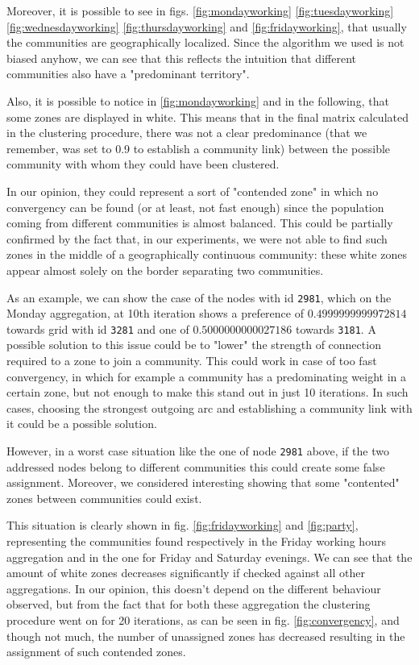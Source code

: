 \documentclass[12pt,a4paper]{article}
\begin{document}
Moreover, it is possible to see in figs. \ref{fig:mondayworking} \ref{fig:tuesdayworking} \ref{fig:wednesdayworking} \ref{fig:thursdayworking} and \ref{fig:fridayworking}, that usually the communities are geographically localized. Since the algorithm we used is not biased anyhow, we can see
that this reflects the intuition that different communities also have a "predominant territory".

Also, it is possible to notice in \ref{fig:mondayworking} and in the following, that some zones are displayed in white. This means that in the final matrix calculated in the clustering procedure, there was not a clear predominance (that we remember, was set to 0.9 to establish a community link) between the possible community with whom they could have been clustered.

In our opinion, they could represent a sort of "contended zone" in which no convergency can be found (or at least, not fast enough) since the population coming from different communities is almost balanced. This could be partially confirmed by the fact that, in our experiments,
we were not able to find such zones in the middle of a geographically continuous community: these white zones appear almost solely on the border separating two communities.

As an example, we can show the case of the nodes with id \texttt{2981}, which on the Monday aggregation, at 10th iteration shows a preference of $0.4999999999972814$ towards grid with id \texttt{3281} and one of $0.5000000000027186$ towards \texttt{3181}.
A possible solution to this issue could be to "lower" the strength of connection required to a zone to join a community. This could work in case of too fast convergency, in which for example a community has a predominating weight in a certain zone, but not enough to make this stand out in just 10 iterations. In such cases, choosing the strongest outgoing arc and establishing a community link with it could be a possible solution. 


However, in a worst case situation like the one of node \texttt{2981} above, if the two addressed nodes belong to different communities this could create some false assignment. Moreover, we considered interesting showing that some "contented" zones between communities could exist.

This situation is clearly shown in fig. \ref{fig:fridayworking} and \ref{fig:party}, representing the communities found respectively in the Friday working hours aggregation and in the one for Friday and Saturday evenings. We can see that the amount of white zones decreases significantly if checked against all other aggregations. In our opinion, this doesn't depend on the different behaviour observed, but from the fact that for both these aggregation the clustering procedure went on for 20 iterations, as can be seen in fig. \ref{fig:convergency}, and though not much, the number of unassigned zones has decreased resulting in the assignment of such contended zones.
\end{document}
